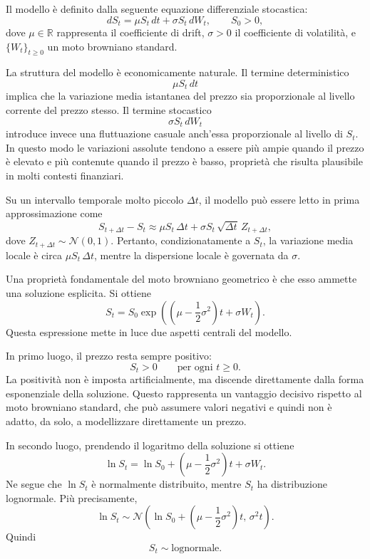 Il modello \`e definito dalla seguente equazione differenziale
stocastica:
\[
dS_t=\mu S_t\,dt+\sigma S_t\,dW_t,
\qquad
S_0>0,
\]
dove $\mu \in \mathbb{R}$ rappresenta il coefficiente di drift,
$\sigma>0$ il coefficiente di volatilit\`a, e $\{W_t\}_{t\geq 0}$ un moto
browniano standard.

La struttura del modello \`e economicamente naturale. Il termine
deterministico
\[
\mu S_t\,dt
\]
implica che la variazione media istantanea del prezzo sia proporzionale
al livello corrente del prezzo stesso. Il termine stocastico
\[
\sigma S_t\,dW_t
\]
introduce invece una fluttuazione casuale anch'essa proporzionale al
livello di $S_t$. In questo modo le variazioni assolute tendono a essere
pi\`u ampie quando il prezzo \`e elevato e pi\`u contenute quando il prezzo
\`e basso, propriet\`a che risulta plausibile in molti contesti
finanziari.

Su un intervallo temporale molto piccolo $\Delta t$, il modello pu\`o
essere letto in prima approssimazione come
\[
S_{t+\Delta t}-S_t
\approx
\mu S_t\,\Delta t+\sigma S_t\,\sqrt{\Delta t}\,Z_{t+\Delta t},
\]
dove $Z_{t+\Delta t}\sim \mathcal{N}(0,1)$. Pertanto, condizionatamente
a $S_t$, la variazione media locale \`e circa $\mu S_t\,\Delta t$, mentre
la dispersione locale \`e governata da $\sigma$.

Una propriet\`a fondamentale del moto browniano geometrico \`e che esso
ammette una soluzione esplicita. Si ottiene
\[
S_t
=
S_0
\exp\left(
\left(\mu-\frac{1}{2}\sigma^2\right)t+\sigma W_t
\right).
\]
Questa espressione mette in luce due aspetti centrali del modello.

In primo luogo, il prezzo resta sempre positivo:
\[
S_t>0
\qquad
\text{per ogni } t\geq 0.
\]
La positivit\`a non \`e imposta artificialmente, ma discende direttamente
dalla forma esponenziale della soluzione. Questo rappresenta un vantaggio
decisivo rispetto al moto browniano standard, che pu\`o assumere valori
negativi e quindi non \`e adatto, da solo, a modellizzare direttamente un
prezzo.

In secondo luogo, prendendo il logaritmo della soluzione si ottiene
\[
\ln S_t
=
\ln S_0
+
\left(\mu-\frac{1}{2}\sigma^2\right)t
+
\sigma W_t.
\]
Ne segue che $\ln S_t$ \`e normalmente distribuito, mentre $S_t$ ha
distribuzione lognormale. Pi\`u precisamente,
\[
\ln S_t
\sim
\mathcal{N}
\left(
\ln S_0+\left(\mu-\frac{1}{2}\sigma^2\right)t,\,
\sigma^2 t
\right).
\]
Quindi
\[
S_t
\sim
\text{lognormale}.
\]

